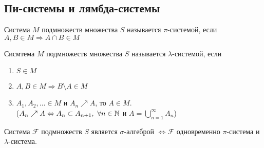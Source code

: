 \documentclass[a4paper, 12pt]{article}
\begin{document}
\subsection{Пи-системы и лямбда-системы}
\begin{definition}
    Система $M$ подмножеств множества $S$ называется $\pi$-системой, если $A,B\in M \Rightarrow A\cap B\in M$
\end{definition}
\begin{definition}
    Сисмтема $M$ подмножеств множества $S$ называется $\lambda$-системой, если
    \begin{enumerate}
        \item $S\in M$
        \item $A,B\in M \Rightarrow B\setminus A\in M$
        \item $A_1, A_2, \dots \in M$ и $A_n \nearrow A$, то $A\in M$.\\
        ($A_n \nearrow A \Leftrightarrow A_n\subset A_{n+1},\ \forall n\in \mathbb{N}$ и $A=\bigcup\limits_{n=1}^{\infty}A_n$)
    \end{enumerate}
\end{definition}
\begin{theorem}
    Система $\mathcal{F}$ подмножеств $S$ является $\sigma$-алгеброй $\Leftrightarrow \mathcal{F}$ одновременно $\pi$-система и $\lambda$-система.
\end{theorem}
\end{document}
